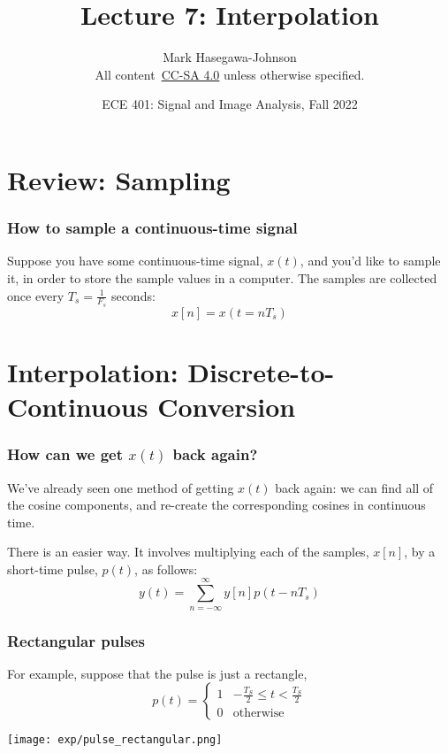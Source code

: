 \documentclass{beamer}
\title{Lecture 7: Interpolation}
\author{Mark Hasegawa-Johnson\\All content~\href{https://creativecommons.org/licenses/by-sa/4.0/}{CC-SA 4.0} unless otherwise specified.}
\date{ECE 401: Signal and Image Analysis, Fall 2022}
\begin{document}
\begin{frame}
  \maketitle
\end{frame}

\begin{frame}
  \tableofcontents
\end{frame}

\section[Sampling]{Review: Sampling}
\setcounter{subsection}{1}

\begin{frame}
  \frametitle{How to sample a continuous-time signal}

  Suppose you have some continuous-time signal, $x(t)$, and you'd like
  to sample it, in order to store the sample values in a computer.
  The samples are collected once every $T_s=\frac{1}{F_s}$ seconds:
  \begin{displaymath}
    x[n] = x(t=nT_s)
  \end{displaymath}
\end{frame}

\section[Interpolation]{Interpolation: Discrete-to-Continuous Conversion}
\setcounter{subsection}{1}

\begin{frame}
  \frametitle{How can we get $x(t)$ back again?}

  We've already seen one method of getting $x(t)$ back again: we can
  find all of the cosine components, and re-create the corresponding
  cosines in continuous time.

  There is an easier way.  It involves multiplying each of the
  samples, $x[n]$, by a short-time pulse, $p(t)$, as follows:
  \begin{displaymath}
    y(t) = \sum_{n=-\infty}^\infty y[n]p(t-nT_s)
  \end{displaymath}
\end{frame}

\begin{frame}
  \frametitle{Rectangular pulses}

  For example, suppose that the pulse is  just a  rectangle,
  \begin{displaymath}
    p(t) = \begin{cases}
      1 & -\frac{T_S}{2}\le t<\frac{T_S}{2}\\
      0 & \mbox{otherwise}
    \end{cases}
  \end{displaymath}

  \centerline{\texttt{[image: exp/pulse\_rectangular.png]}}  
\end{frame}
\end{document}
